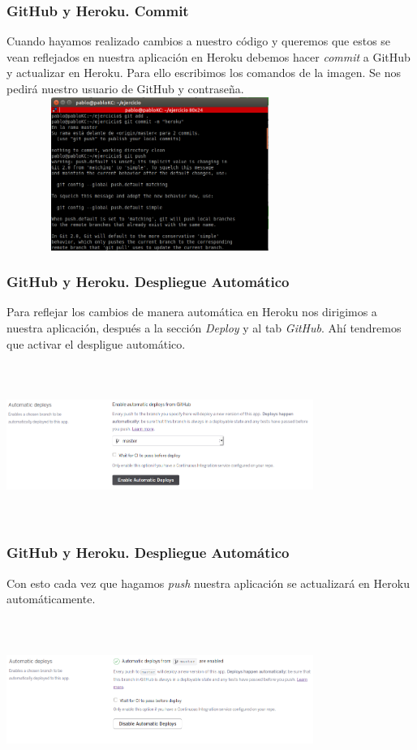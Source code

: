 \documentclass{beamer}
\begin{document}
\begin{frame}
\frametitle{GitHub y Heroku. Commit}
Cuando hayamos realizado cambios a nuestro código y queremos que estos se vean reflejados en nuestra aplicación en Heroku debemos hacer \textit{commit} a GitHub y actualizar en Heroku. Para ello escribimos los comandos de la imagen. Se nos pedirá nuestro usuario de GitHub y contraseña.\\
\centering
\includegraphics[width=10cm, height=5cm]{githubHeroku/28.png}
\end{frame}

\begin{frame}
\frametitle{GitHub y Heroku. Despliegue Automático}
Para reflejar los cambios de manera automática en Heroku nos dirigimos a nuestra aplicación, después a la sección \textit{Deploy} y al tab \textit{GitHub}. Ahí tendremos que activar el despligue automático.\\ \ \\
\includegraphics[width=10cm, height=5cm]{githubHeroku/33.png}
\end{frame}

\begin{frame}
\frametitle{GitHub y Heroku. Despliegue Automático}
Con esto cada vez que hagamos \textit{push} nuestra aplicación se actualizará en Heroku automáticamente. \\ \ \\
\includegraphics[width=10cm, height=5cm]{githubHeroku/34.png}
\end{frame}
\end{document}

